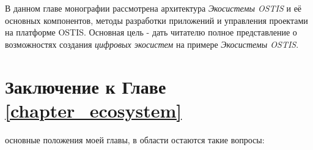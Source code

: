 В данном главе монографии рассмотрена архитектура \textit{Экосистемы OSTIS} и её основных компонентов, методы разработки приложений и управления проектами на платформе OSTIS. Основная цель - дать читателю полное представление о возможностях создания \textit{цифровых экосистем} на примере \textit{Экосистемы OSTIS}.









%

\section*{Заключение к Главе \ref{chapter_ecosystem}}
основные положения моей главы, в области остаются такие вопросы:
